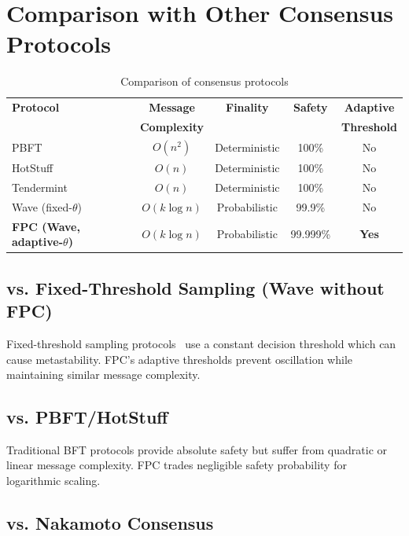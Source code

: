 \documentclass[11pt,a4paper]{article}
\begin{document}
\section{Comparison with Other Consensus Protocols}
\label{sec:comparison}

\begin{table}[h]
\centering
\begin{tabular}{lcccc}
\toprule
\textbf{Protocol} & \textbf{Message} & \textbf{Finality} & \textbf{Safety} & \textbf{Adaptive} \\
& \textbf{Complexity} & & & \textbf{Threshold} \\
\midrule
PBFT & $O(n^2)$ & Deterministic & 100\% & No \\
HotStuff & $O(n)$ & Deterministic & 100\% & No \\
Tendermint & $O(n)$ & Deterministic & 100\% & No \\
Wave (fixed-$\theta$)~\cite{rocket2018wave} & $O(k \log n)$ & Probabilistic & 99.9\% & No \\
\textbf{FPC (Wave, adaptive-$\theta$)} & $O(k \log n)$ & Probabilistic & 99.999\% & \textbf{Yes} \\
\bottomrule
\end{tabular}
\caption{Comparison of consensus protocols}
\label{tab:comparison}
\end{table}

\subsection{vs. Fixed-Threshold Sampling (Wave without FPC)}

Fixed-threshold sampling protocols~\cite{rocket2018wave} use a constant decision threshold which can cause metastability. FPC's adaptive thresholds prevent oscillation while maintaining similar message complexity.

\subsection{vs. PBFT/HotStuff}

Traditional BFT protocols provide absolute safety but suffer from quadratic or linear message complexity. FPC trades negligible safety probability for logarithmic scaling.

\subsection{vs. Nakamoto Consensus}
\end{document}
